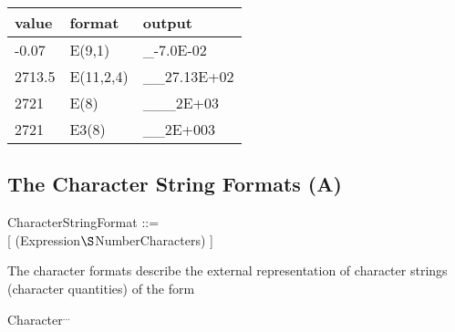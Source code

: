 \begin{accepted}
\begin{tabular}{lll}
value  & format    & output \\ \hline
-0.07  & E(9,1)    & \_-7.0E-02 \\
2713.5 & E(11,2,4) & \_\_27.13E+02 \\
2721   & E(8)      & \_\_\_2E+03 \\
2721   & E3(8)      & \_\_2E+003
\end{tabular}
\end{accepted}

\subsection{The Character String Formats (A)}  %
\label{sec_dation_a_format}

CharacterStringFormat ::=\\
 [ (Expression$\S $NumberCharacters) ]

The character formats describe the external representation of character
strings (character quantities) of the form

Character$^{...}$


